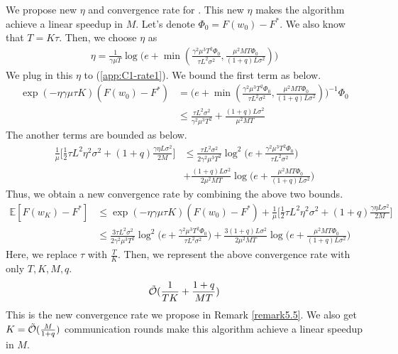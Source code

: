 We propose new $\eta$ and convergence rate for \citet{haddadpour2021federated}. This new $\eta$ makes the algorithm achieve a linear speedup in $M$. Let's denote $\Phi_0 = F(w_0) - F^*$. We also know that $T = K\tau$. Then, we choose $\eta$ as
\begin{align*}
    \eta = \frac{1}{\gamma\mu T}\log \Big( e+ \min (\frac{\gamma^2\mu^3 T^2 \Phi_0}{\tau L^2\sigma^2}, \frac{\mu^2 MT\Phi_0}{(1+q)L\sigma^2})\Big)
\end{align*}
We plug in this $\eta$ to (\ref{app:C1-rate1}). We bound the first term as below.
\begin{align*}
    \exp(-\eta\gamma\mu\tau K)(F(w_0) - F^*) &= \Big( e+ \min (\frac{\gamma^2\mu^3 T^2 \Phi_0}{\tau L^2\sigma^2}, \frac{\mu^2 MT\Phi_0}{(1+q)L\sigma^2})\Big)^{-1} \Phi_0 \\
    &\leq \frac{\tau L^2\sigma^2}{\gamma^2\mu^3 T^2} + \frac{(1+q)L\sigma^2}{\mu^2 MT}
\end{align*}
The another terms are bounded as below.
\begin{align*}
    \frac{1}{\mu}\Big[\frac{1}{2}\tau L^2\eta^2\sigma^2 + (1+q)\frac{\gamma\eta L\sigma^2}{2M}\Big] &\leq \frac{\tau L^2\sigma^2}{2\gamma^2\mu^3 T^2} \log^2 \Big( e+\frac{\gamma^2\mu^3 T^2\Phi_0}{\tau L^2\sigma^2}\Big) \\
    &+ \frac{(1+q)L\sigma^2}{2\mu^2 MT}\log\Big( e+ \frac{\mu^2 MT\Phi_0}{(1+q)L\sigma^2}\Big)
\end{align*}
Thus, we obtain a new convergence rate by combining the above two bounds.
\begin{align*}
    \mathbb{E}[F(w_K)- F^*] &\leq \exp(-\eta\gamma\mu\tau K)(F(w_0) - F^*) + \frac{1}{\mu}\Big[\frac{1}{2}\tau L^2\eta^2\sigma^2 + (1+q)\frac{\gamma\eta L\sigma^2}{2M}\Big] \\
    &\leq \frac{3\tau L^2\sigma^2}{2\gamma^2\mu^3 T^2} \log^2 \Big( e+\frac{\gamma^2\mu^3 T^2\Phi_0}{\tau L^2\sigma^2}\Big) + \frac{3(1+q)L\sigma^2}{2\mu^2 MT}\log\Big( e+ \frac{\mu^2 MT\Phi_0}{(1+q)L\sigma^2}\Big)
\end{align*}
Here, we replace $\tau$ with $\frac{T}{K}$. Then, we represent the above convergence rate with only $T, K, M, q$.
\begin{gather*}
    \Tilde{\mathcal{O}}(\frac{1}{TK} + \frac{1+q}{MT})
\end{gather*}
This is the new convergence rate we propose in Remark \ref{remark5.5}. We also get $K = \Tilde{\mathcal{O}}(\frac{M}{1+q})$ communication rounds make this algorithm achieve a linear speedup in $M$. 

